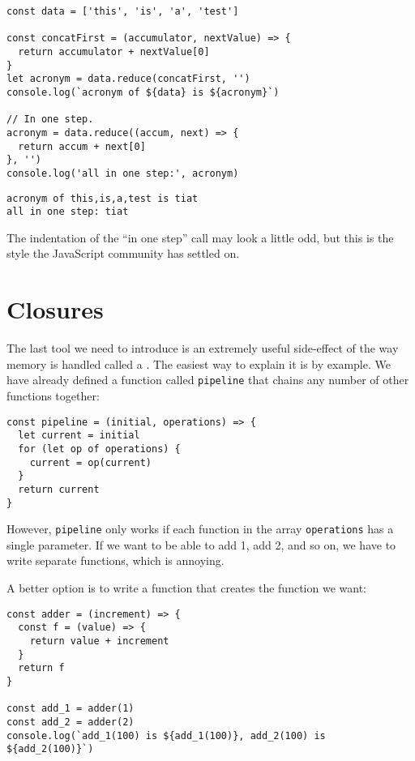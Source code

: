 \begin{verbatim}
const data = ['this', 'is', 'a', 'test']

const concatFirst = (accumulator, nextValue) => {
  return accumulator + nextValue[0]
}
let acronym = data.reduce(concatFirst, '')
console.log(`acronym of ${data} is ${acronym}`)

// In one step.
acronym = data.reduce((accum, next) => {
  return accum + next[0]
}, '')
console.log('all in one step:', acronym)
\end{verbatim}

\begin{verbatim}
acronym of this,is,a,test is tiat
all in one step: tiat
\end{verbatim}

The indentation of the ``in one step'' call may look a little odd,
but this is the style the JavaScript community has settled on.

\section{Closures}\label{s:callbacks-closures}

The last tool we need to introduce is an extremely useful side-effect of the way memory is handled
called a .
The easiest way to explain it is by example.
We have already defined a function called \texttt{pipeline} that chains any number of other functions together:

\begin{verbatim}
const pipeline = (initial, operations) => {
  let current = initial
  for (let op of operations) {
    current = op(current)
  }
  return current
}
\end{verbatim}

However,
\texttt{pipeline} only works if each function in the array \texttt{operations} has a single parameter.
If we want to be able to add 1,
add 2,
and so on,
we have to write separate functions,
which is annoying.

A better option is to write a function that creates the function we want:

\begin{verbatim}
const adder = (increment) => {
  const f = (value) => {
    return value + increment
  }
  return f
}

const add_1 = adder(1)
const add_2 = adder(2)
console.log(`add_1(100) is ${add_1(100)}, add_2(100) is ${add_2(100)}`)
\end{verbatim}

